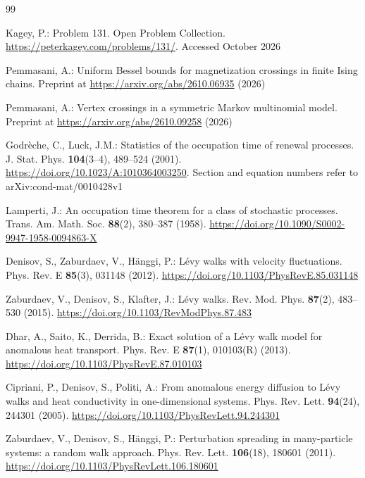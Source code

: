\begin{thebibliography}{99}\small\setlength{\baselineskip}{11pt}\setlength{\itemsep}{0pt}\setlength{\parsep}{0pt}

Kagey, P.: Problem 131. Open Problem Collection.
\url{https://peterkagey.com/problems/131/}. Accessed October 2026

Pemmasani, A.: Uniform Bessel bounds for magnetization crossings in finite
Ising chains. Preprint at \url{https://arxiv.org/abs/2610.06935} (2026)

Pemmasani, A.: Vertex crossings in a symmetric Markov multinomial model.
Preprint at \url{https://arxiv.org/abs/2610.09258} (2026)

Godr\`eche, C., Luck, J.M.: Statistics of the occupation time of renewal
processes. J. Stat. Phys. \textbf{104}(3--4), 489--524 (2001).
\url{https://doi.org/10.1023/A:1010364003250}. Section and equation numbers
refer to arXiv:cond-mat/0010428v1

Lamperti, J.: An occupation time theorem for a class of stochastic processes.
Trans. Am. Math. Soc. \textbf{88}(2), 380--387 (1958).
\url{https://doi.org/10.1090/S0002-9947-1958-0094863-X}

Denisov, S., Zaburdaev, V., H\"anggi, P.: L\'evy walks with velocity
fluctuations. Phys. Rev. E \textbf{85}(3), 031148 (2012).
\url{https://doi.org/10.1103/PhysRevE.85.031148}

Zaburdaev, V., Denisov, S., Klafter, J.: L\'evy walks. Rev. Mod. Phys.
\textbf{87}(2), 483--530 (2015).
\url{https://doi.org/10.1103/RevModPhys.87.483}

Dhar, A., Saito, K., Derrida, B.: Exact solution of a L\'evy walk model for
anomalous heat transport. Phys. Rev. E \textbf{87}(1), 010103(R) (2013).
\url{https://doi.org/10.1103/PhysRevE.87.010103}

Cipriani, P., Denisov, S., Politi, A.: From anomalous energy diffusion to
L\'evy walks and heat conductivity in one-dimensional systems. Phys. Rev.
Lett. \textbf{94}(24), 244301 (2005).
\url{https://doi.org/10.1103/PhysRevLett.94.244301}

Zaburdaev, V., Denisov, S., H\"anggi, P.: Perturbation spreading in
many-particle systems: a random walk approach. Phys. Rev. Lett.
\textbf{106}(18), 180601 (2011).
\url{https://doi.org/10.1103/PhysRevLett.106.180601}


\end{thebibliography}
